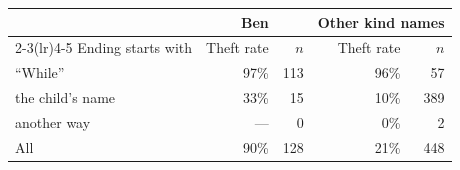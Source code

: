 \begin{tabular}{lrrrr}
\toprule
 & \multicolumn{2}{c}{Ben} & \multicolumn{2}{c}{Other kind names} \\
\cmidrule(lr){2-3}\cmidrule(lr){4-5}
Ending starts with & Theft rate & $n$ & Theft rate & $n$ \\
\midrule
``While'' & 97\% & 113 & 96\% & 57 \\
the child's name & 33\% & 15 & 10\% & 389 \\
another way & --- & 0 & 0\% & 2 \\
\midrule
All & 90\% & 128 & 21\% & 448 \\
\bottomrule
\end{tabular}
